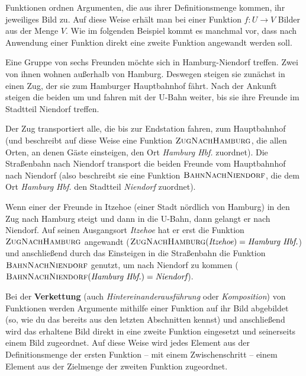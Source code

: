 \documentclass[../../main.tex]{subfiles}
\begin{document}
\label{sec:abbildungen_verkettung}

Funktionen ordnen Argumenten, die aus ihrer Definitionsmenge kommen, ihr jeweiliges Bild zu. Auf diese Weise erhält man bei einer Funktion $f\colon U\rightarrow V$ Bilder aus der Menge $V$. Wie im folgenden Beispiel kommt es manchmal vor, dass nach Anwendung einer Funktion direkt eine zweite Funktion angewandt werden soll.

\begin{example}{}
    Eine Gruppe von sechs Freunden möchte sich in Hamburg-Niendorf treffen. Zwei von ihnen wohnen außerhalb von Hamburg. Deswegen steigen sie zunächst in einen Zug, der sie zum Hamburger Hauptbahnhof fährt. Nach der Ankunft steigen die beiden um und fahren mit der U-Bahn weiter, bis sie ihre Freunde im Stadtteil Niendorf treffen.
    
    Der Zug transportiert alle, die bis zur Endstation fahren, zum Hauptbahnhof (und beschreibt auf diese Weise eine Funktion $\textsc{ZugNachHamburg}$, die allen Orten, an denen Gäste einsteigen, den Ort \emph{Hamburg Hbf.} zuordnet). Die Straßenbahn nach Niendorf transport die beiden Freunde vom Hauptbahnhof nach Niendorf (also beschreibt sie eine Funktion $\textsc{BahnNachNiendorf}$, die dem Ort \emph{Hamburg Hbf.} den Stadtteil \emph{Niendorf} zuordnet).
    
    Wenn einer der Freunde in Itzehoe (einer Stadt nördlich von Hamburg) in den Zug nach Hamburg steigt und dann in die U-Bahn, dann gelangt er nach Niendorf. Auf seinen Ausgangsort \emph{Itzehoe} hat er erst die Funktion $\textsc{ZugNachHamburg}$ angewandt ($\textsc{ZugNachHamburg}(\emph{Itzehoe})=\emph{Hamburg Hbf.}$) und anschließend durch das Einsteigen in die Straßenbahn die Funktion $\textsc{BahnNachNiendorf}$ genutzt, um nach Niendorf zu kommen ($\textsc{BahnNachNiendorf}(\emph{Hamburg Hbf.})=\emph{Niendorf}$).
\end{example}

Bei der \textbf{Verkettung} (auch \emph{Hintereinanderausführung} oder \emph{Komposition}) von Funktionen werden Argumente mithilfe einer Funktion auf ihr Bild abgebildet (so, wie du das bereits aus den letzten Abschnitten kennst) und anschließend wird das erhaltene Bild direkt in eine zweite Funktion eingesetzt und seinerseits einem Bild zugeordnet. Auf diese Weise wird jedes Element aus der Definitionsmenge der ersten Funktion -- mit einem Zwischenschritt -- einem Element aus der Zielmenge der zweiten Funktion zugeordnet.
\end{document}
